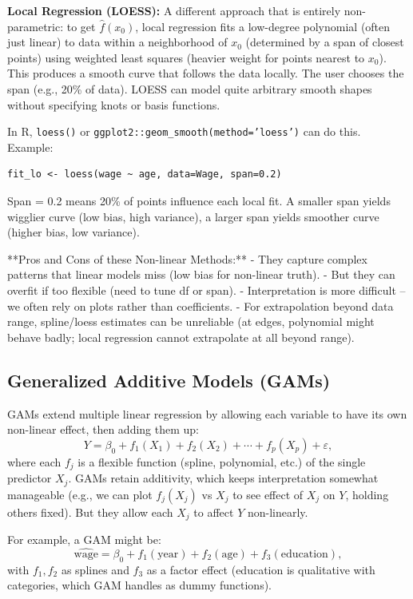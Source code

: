 \documentclass[11pt]{article}
\begin{document}
\textbf{Local Regression (LOESS):} A different approach that is entirely non-parametric: to get $\hat f(x_0)$, local regression fits a low-degree polynomial (often just linear) to data within a neighborhood of $x_0$ (determined by a span of closest points) using weighted least squares (heavier weight for points nearest to $x_0$). This produces a smooth curve that follows the data locally. The user chooses the span (e.g., 20\% of data). LOESS can model quite arbitrary smooth shapes without specifying knots or basis functions.

In R, \texttt{loess()} or \texttt{ggplot2::geom\_smooth(method='loess')} can do this. Example:
\begin{verbatim}
fit_lo <- loess(wage ~ age, data=Wage, span=0.2)
\end{verbatim}
Span = 0.2 means 20\% of points influence each local fit. A smaller span yields wigglier curve (low bias, high variance), a larger span yields smoother curve (higher bias, low variance).

**Pros and Cons of these Non-linear Methods:**
- They capture complex patterns that linear models miss (low bias for non-linear truth).
- But they can overfit if too flexible (need to tune df or span).
- Interpretation is more difficult – we often rely on plots rather than coefficients.
- For extrapolation beyond data range, spline/loess estimates can be unreliable (at edges, polynomial might behave badly; local regression cannot extrapolate at all beyond range).

\subsection{Generalized Additive Models (GAMs)}
GAMs extend multiple linear regression by allowing each variable to have its own non-linear effect, then adding them up:
\[ Y = \beta_0 + f_1(X_1) + f_2(X_2) + \cdots + f_p(X_p) + \varepsilon, \]
where each $f_j$ is a flexible function (spline, polynomial, etc.) of the single predictor $X_j$. GAMs retain additivity, which keeps interpretation somewhat manageable (e.g., we can plot $f_j(X_j)$ vs $X_j$ to see effect of $X_j$ on $Y$, holding others fixed). But they allow each $X_j$ to affect $Y$ non-linearly.

For example, a GAM might be:
\[ \widehat{\text{wage}} = \beta_0 + f_1(\text{year}) + f_2(\text{age}) + f_3(\text{education}), \]
with $f_1, f_2$ as splines and $f_3$ as a factor effect (education is qualitative with categories, which GAM handles as dummy functions).
\end{document}
